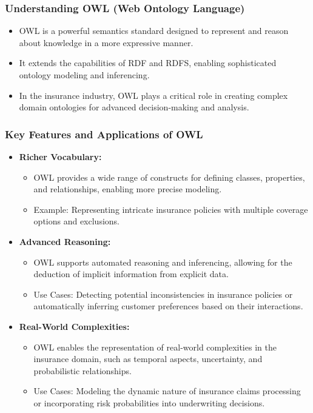 \begin{frame}[fragile]
\frametitle{Understanding OWL (Web Ontology Language)}
\begin{itemize}
\item OWL is a powerful semantics standard designed to represent and reason about knowledge in a more expressive manner.
\item It extends the capabilities of RDF and RDFS, enabling sophisticated ontology modeling and inferencing.
\item In the insurance industry, OWL plays a critical role in creating complex domain ontologies for advanced decision-making and analysis.
\end{itemize}
\end{frame}

\begin{frame}[fragile]
\frametitle{Key Features and Applications of OWL}
\begin{itemize}
\item \textbf{Richer Vocabulary:}
\begin{itemize}
\item OWL provides a wide range of constructs for defining classes, properties, and relationships, enabling more precise modeling.
\item Example: Representing intricate insurance policies with multiple coverage options and exclusions.
\end{itemize}

\item \textbf{Advanced Reasoning:}
\begin{itemize}
\item OWL supports automated reasoning and inferencing, allowing for the deduction of implicit information from explicit data.
\item Use Cases: Detecting potential inconsistencies in insurance policies or automatically inferring customer preferences based on their interactions.
\end{itemize}

\item \textbf{Real-World Complexities:}
\begin{itemize}
\item OWL enables the representation of real-world complexities in the insurance domain, such as temporal aspects, uncertainty, and probabilistic relationships.
\item Use Cases: Modeling the dynamic nature of insurance claims processing or incorporating risk probabilities into underwriting decisions.
\end{itemize}
\end{itemize}
\end{frame}